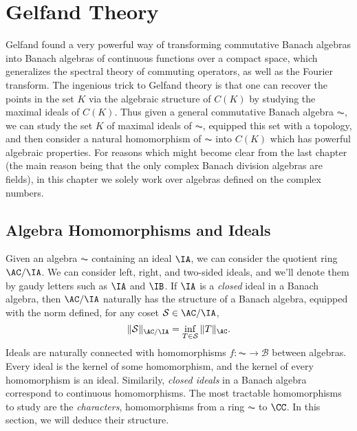 \chapter{Gelfand Theory}

Gelfand found a very powerful way of transforming commutative Banach algebras into Banach algebras of continuous functions over a compact space, which generalizes the spectral theory of commuting operators, as well as the Fourier transform. The ingenious trick to Gelfand theory is that one can recover the points in the set $K$ via the algebraic structure of $C(K)$ by studying the maximal ideals of $C(K)$. Thus given a general commutative Banach algebra $\AC$, we can study the set $K$ of maximal ideals of $\AC$, equipped this set with a topology, and then consider a natural homomorphism of $\AC$ into $C(K)$ which has powerful algebraic properties. For reasons which might become clear from the last chapter (the main reason being that the only complex Banach division algebras are fields), in this chapter we solely work over algebras defined on the complex numbers.

\section{Algebra Homomorphisms and Ideals}

Given an algebra $\AC$ containing an ideal $\IA$, we can consider the quotient ring $\AC / \IA$. We can consider left, right, and two-sided ideals, and we'll denote them by gaudy letters such as $\IA$ and $\IB$. If $\IA$ is a \emph{closed} ideal in a Banach algebra, then $\AC / \IA$ naturally has the structure of a Banach algebra, equipped with the norm defined, for any coset $\mathcal{S} \in \AC / \IA$,
%
\[ \| \mathcal{S} \|_{\AC/\IA} = \inf_{T \in \mathcal{S}} \| T \|_{\AC}. \]
Ideals are naturally connected with homomorphisms $f: \AC \to \mathcal{B}$ between algebras. Every ideal is the kernel of some homomorphism, and the kernel of every homomorphism is an ideal. Similarily, \emph{closed ideals} in a Banach algebra correspond to continuous homomorphisms. The most tractable homomorphisms to study are the \emph{characters}, homomorphisms from a ring $\AC$ to $\CC$. In this section, we will deduce their structure.

